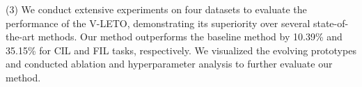 (3) 
We conduct extensive experiments on four datasets to evaluate the performance of the V-LETO, demonstrating its superiority over several state-of-the-art methods.
Our method outperforms the baseline method by 10.39\% and 35.15\% for CIL and FIL tasks, respectively. 
We visualized the evolving prototypes and conducted ablation and hyperparameter analysis to further evaluate our method.



